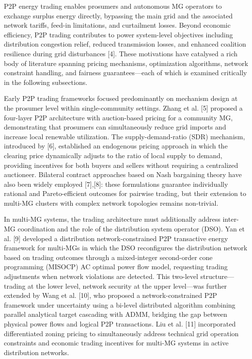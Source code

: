 \documentclass[preprint,12pt]{elsarticle}
\begin{document}
P2P energy trading enables prosumers and autonomous MG operators to exchange surplus energy directly, bypassing the main grid and the associated network tariffs, feed-in limitations, and curtailment losses. Beyond economic efficiency, P2P trading contributes to power system-level objectives including distribution congestion relief, reduced transmission losses, and enhanced coalition resilience during grid disturbances [4]. These motivations have catalysed a rich body of literature spanning pricing mechanisms, optimization algorithms, network constraint handling, and fairness guarantees—each of which is examined critically in the following subsections.

Early P2P trading frameworks focused predominantly on mechanism design at the prosumer level within single-community settings. Zhang et al. [5] proposed a four-layer P2P architecture with auction-based pricing for a community MG, demonstrating that prosumers can simultaneously reduce grid imports and increase local renewable utilization. The supply-demand-ratio (SDR) mechanism, introduced by [6], established an endogenous pricing approach in which the clearing price dynamically adjusts to the ratio of local supply to demand, providing incentives for both buyers and sellers without requiring a centralized auctioneer. Bilateral contract approaches based on Nash bargaining theory have also been widely employed [7],[8]: these formulations guarantee individually rational and Pareto-efficient outcomes for pairwise trading, but their extension to multi-MG clusters with complex network topologies remains non-trivial.

In multi-MG systems, the trading architecture must additionally address inter-MG coordination and the role of the distribution system operator (DSO). Yan et al. [9] developed a distribution network-constrained P2P transactive energy framework for multi-MGs in which the DSO reconfigures the distribution network based on trading outcomes through a mixed-integer second-order cone programming (MISOCP) AC optimal power flow model, requesting trading adjustments when network violations are detected. This two-level structure—trading at the lower level, network security at the upper level—was further extended by Wang et al. [10], who proposed a network-constrained P2P framework under uncertainty using a bi-level distributed algorithm combining parallel analytical target cascading with ADMM, bridging the gap between physical power flows and logical P2P transactions. Liu et al. [11] incorporated differentiated zoning pricing to simultaneously address technical grid operation constraints and economic trading incentives for multi-MG systems in active distribution networks.
\end{document}
